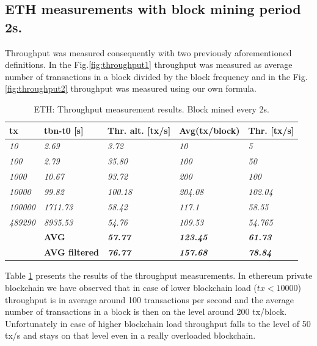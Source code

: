 \subsection{ETH measurements with block mining period 2s.}
Throughput was measured consequently with two previously aforementioned definitions. In the Fig.\ref{fig:throughput1} throughput was measured as average number of transactions in a block divided by the block frequency and in the Fig.\ref{fig:throughput2} throughput was measured using our own formula.
 
\begin{table}[!h]
\centering
\begin{tabular}{l|l|l|l|l|}
\hline
\multicolumn{1}{|l|}{\textbf{tx}} & \textbf{tbn-t0 {[}s{]}} & \textbf{Thr. alt. {[}tx/s{]}} & \textbf{Avg(tx/block)} & \textbf{Thr. {[}tx/s{]}} \\ \hline
\multicolumn{1}{|l|}{\textit{10}} & \textit{2.69} & \textit{3.72} & \textit{10} & \textit{5} \\ \hline
\multicolumn{1}{|l|}{\textit{100}} & \textit{2.79} & \textit{35.80} & \textit{100} & \textit{50} \\ \hline
\multicolumn{1}{|l|}{\textit{1000}} & \textit{10.67} & \textit{93.72} & \textit{200} & \textit{100} \\ \hline
\multicolumn{1}{|l|}{\textit{10000}} & \textit{99.82} & \textit{100.18} & \textit{204.08} & \textit{102.04} \\ \hline
\multicolumn{1}{|l|}{\textit{100000}} & \textit{1711.73} & \textit{58.42} & \textit{117.1} & \textit{58.55} \\ \hline
\multicolumn{1}{|l|}{\textit{489290}} & \textit{8935.53} & \textit{54.76} & \textit{109.53} & \textit{54.765} \\ \hline
& \textbf{AVG} & \textit{\textbf{57.77}} & \textit{\textbf{123.45}} & \textit{\textbf{61.73}} \\ \cline{2-5}
& \textbf{AVG filtered} & \textit{\textbf{76.77}} & \textit{\textbf{157.68}} & \textit{\textbf{78.84}} \\ \cline{2-5}
\end{tabular}
\caption{ETH: Throughput measurement results. Block mined every 2s.}
\label{table:2}
\end{table}
 
Table \ref{table:2} presents the results of the throughput measurements. In ethereum private blockchain we have observed that in case of lower blockchain load ($tx < 10000$) throughput is in average around 100 transactions per second and the average number of transactions in a block is then on the level around 200 tx/block. Unfortunately in case of higher blockchain load  throughput falls to the level of 50 tx/s and stays on that level even in a really overloaded blockchain.
 
